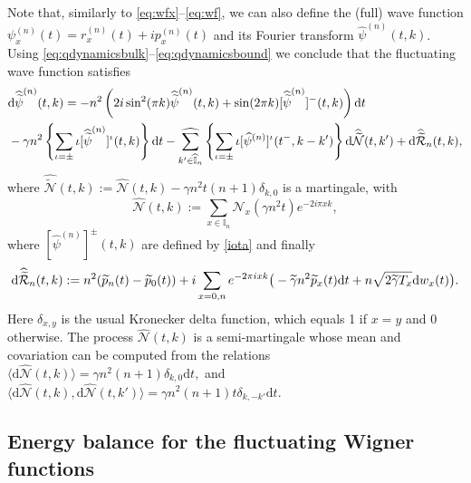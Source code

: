 \documentclass[EJP]{ejpecp} %
\newcommand\T{{\mathbb I}}
\newcommand \ga{\gamma}
\newcommand{\dd  }{\mathrm{d}}
\renewcommand{\hat}{\widehat}
\renewcommand{\tilde}{\widetilde}
\numberwithin{equation}{section}
\begin{document}
%
%
%
%
%
%
%
%
%
%
%
%
%
%
Note that, similarly to \eqref{eq:wfx}--\eqref{eq:wf}, we can also define the (full) wave function $\psi_x^{(n)}(t)=r_x^{(n)}(t)+ip_x^{(n)}(t)$ and its Fourier transform $\hat\psi^{(n)}(t,k)$. Using \eqref{eq:qdynamicsbulk}--\eqref{eq:qdynamicsbound} we conclude that
the fluctuating  wave function satisfies
\begin{align}
\label{010502-20psi}
 &
 \dd\hat{\tilde\psi}^{(n)}(t,k)= -{n^2} \left(2i \sin^2(\pi k) \hat{\tilde\psi}^{(n)}(t,k) + \sin(2\pi k)
  [\hat{\tilde\psi}^{(n)}]^-(t,k) \right) \dd t \\
&
- \ga n^2\left\{\sum_{\iota=\pm} \iota[\hat{\tilde\psi}^{(n)}]^\iota (t,k) \right\}
   \dd t
-  \underset{{k'\in \widehat{\T}_n}}{{\hat\sum}} \left\{\sum_{\iota=\pm} \iota[\hat\psi^{(n)}]^\iota(t^-,k-k') 
   \right\} \dd\widehat{\tilde{\mathcal
    N}}(t,k')+\dd\hat{\tilde{\cal R}}_n(t,k),\notag
\end{align}
where  $
\widehat{\tilde{\mathcal
    N}}(t,k):=\widehat{\mathcal{N}}(  t,  k)-\ga n^2 t(n+1)\delta_{k,0}
$ is a martingale, with
$$
\widehat{{\mathcal
    N}}(t,k):=\sum_{x\in \T_n} \mathcal N_x(\gamma n^2 t) e^{-2i\pi x k},
$$
where $[\hat\psi^{(n)}]^\pm(t,k)$ are defined by \eqref{iota} 
and finally
  \[
\dd\hat{\tilde{\cal R}}_n(t,k):=n^2(\tilde p_n(t)-\tilde p_0(t))
 +  i\sum_{x=0,n}e^{-2\pi i x k} \big( -\tilde\gamma n^2 \tilde p_{x}(t) \dd t+ n\sqrt{2\tilde\gamma T_x}
  \dd w_{x}(t)\big).
 \]
Here $\delta_{x,y}$ is the usual Kronecker delta function, which equals 1 if $x=y$ and 0 otherwise. 
The process $\widehat{{\mathcal
    N}}(t,k)$ is a semi-martingale whose mean and covariation can be
computed from the relations
$
\langle \dd\widehat{\mathcal{N}}(  t,  k)\rangle=\gamma n^2(n+1)  \delta_{k,0} \dd t,$ and $
\langle \dd\widehat{\mathcal{N}}(  t,  k),\dd\widehat{\mathcal{N}}(t,k')\rangle=\gamma n^2(n+1) t \delta_{k,-k'} \dd t.
$







\subsection{Energy balance for the fluctuating Wigner functions} \label{sec:balance}
\end{document}
